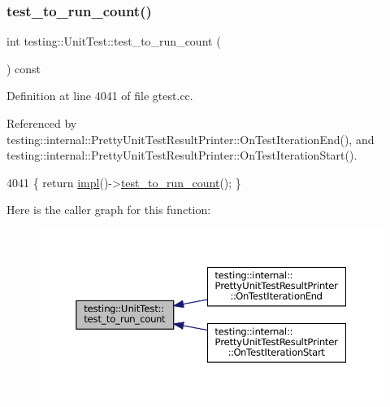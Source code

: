 \subsubsection{\texorpdfstring{test\+\_\+to\+\_\+run\+\_\+count()}{test\_to\_run\_count()}}
{\footnotesize\ttfamily int testing\+::\+Unit\+Test\+::test\+\_\+to\+\_\+run\+\_\+count (\begin{DoxyParamCaption}{ }\end{DoxyParamCaption}) const}



Definition at line 4041 of file gtest.\+cc.



Referenced by testing\+::internal\+::\+Pretty\+Unit\+Test\+Result\+Printer\+::\+On\+Test\+Iteration\+End(), and testing\+::internal\+::\+Pretty\+Unit\+Test\+Result\+Printer\+::\+On\+Test\+Iteration\+Start().


\begin{DoxyCode}
4041 \{ \textcolor{keywordflow}{return} \hyperlink{classtesting_1_1UnitTest_a4df5d11a58affb337d7fa62eaa07690e}{impl}()->\hyperlink{classtesting_1_1internal_1_1UnitTestImpl_a0f15365d1d1ce00eaeb6f8a1370113ec}{test\_to\_run\_count}(); \}
\end{DoxyCode}
Here is the caller graph for this function\+:
\nopagebreak
\begin{figure}[H]
\begin{center}
\leavevmode
\includegraphics[width=350pt]{classtesting_1_1UnitTest_a461f46b2976f135d2a65e8d3def746e9_icgraph}
\end{center}
\end{figure}
\mbox{\label{classtesting_1_1UnitTest_a93fc8f4eebc3212d06468ad216830ced}} 
